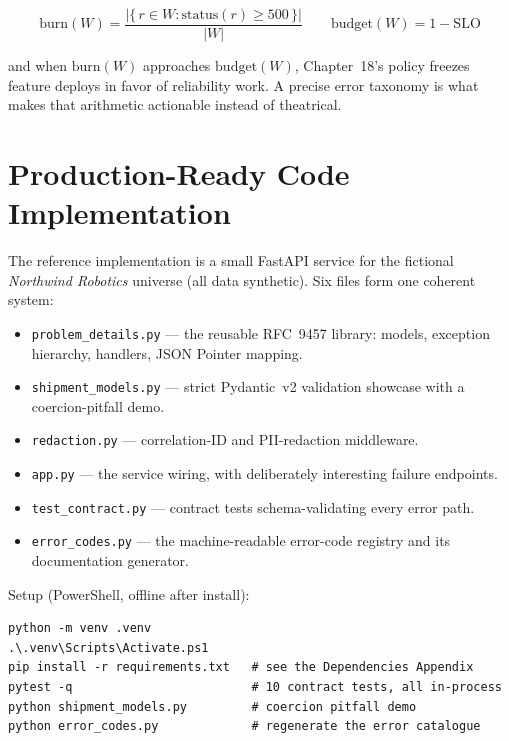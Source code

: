 \begin{equation}
\text{burn}(W) = \frac{\left|\{\,r \in W : \text{status}(r) \ge 500\,\}\right|}{\left|W\right|}
\qquad\text{budget}(W) = 1 - \text{SLO}
\end{equation}

and when $\text{burn}(W)$ approaches $\text{budget}(W)$, Chapter~18's policy
freezes feature deploys in favor of reliability work. A precise error
taxonomy is what makes that arithmetic actionable instead of theatrical.

\section{Production-Ready Code Implementation}
\label{sec:impl}

The reference implementation is a small FastAPI service for the fictional
\emph{Northwind Robotics} universe (all data synthetic). Six files form one
coherent system:

\begin{itemize}
  \item \texttt{problem\_details.py} --- the reusable RFC~9457 library:
        models, exception hierarchy, handlers, JSON Pointer mapping.
  \item \texttt{shipment\_models.py} --- strict Pydantic~v2 validation
        showcase with a coercion-pitfall demo.
  \item \texttt{redaction.py} --- correlation-ID and PII-redaction
        middleware.
  \item \texttt{app.py} --- the service wiring, with deliberately
        interesting failure endpoints.
  \item \texttt{test\_contract.py} --- contract tests schema-validating every
        error path.
  \item \texttt{error\_codes.py} --- the machine-readable error-code
        registry and its documentation generator.
\end{itemize}

Setup (PowerShell, offline after install):

\begin{verbatim}
python -m venv .venv
.\.venv\Scripts\Activate.ps1
pip install -r requirements.txt   # see the Dependencies Appendix
pytest -q                         # 10 contract tests, all in-process
python shipment_models.py         # coercion pitfall demo
python error_codes.py             # regenerate the error catalogue
\end{verbatim}


